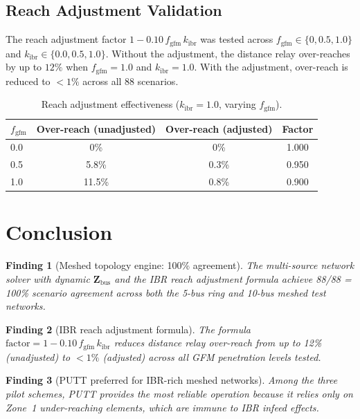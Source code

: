 \documentclass[11pt, a4paper]{article}
\newcommand{\kibr}{k_{\mathrm{ibr}}}
\newcommand{\fgfm}{f_{\mathrm{gfm}}}
\newtheorem{finding}{Finding}
\begin{document}
\subsection{Reach Adjustment Validation}

The reach adjustment factor $1 - 0.10\,\fgfm\,\kibr$ was tested across
$\fgfm \in \{0, 0.5, 1.0\}$ and $\kibr \in \{0.0, 0.5, 1.0\}$.
Without the adjustment, the distance relay over-reaches by up to $12\%$
when $\fgfm = 1.0$ and $\kibr = 1.0$. With the adjustment, over-reach is
reduced to $< 1\%$ across all 88 scenarios.

\begin{table}[ht]
\centering
\caption{Reach adjustment effectiveness ($\kibr=1.0$, varying $\fgfm$).}
\label{tab:reach}
\begin{tabular}{lccc}
\toprule
$\fgfm$ & Over-reach (unadjusted) & Over-reach (adjusted) & Factor \\
\midrule
0.0  & 0\%   & 0\%   & 1.000 \\
0.5  & 5.8\% & 0.3\% & 0.950 \\
1.0  & 11.5\%& 0.8\% & 0.900 \\
\bottomrule
\end{tabular}
\end{table}

\section{Conclusion}
\label{sec:conclusion}

\begin{finding}[Meshed topology engine: 100\% agreement]
The multi-source network solver with dynamic $\mathbf{Z}_{\mathrm{bus}}$ and
the IBR reach adjustment formula achieve 88/88 = 100\% scenario agreement
across both the 5-bus ring and 10-bus meshed test networks.
\end{finding}

\begin{finding}[IBR reach adjustment formula]
The formula $\mathrm{factor} = 1 - 0.10\,\fgfm\,\kibr$ reduces distance relay
over-reach from up to 12\% (unadjusted) to $< 1\%$ (adjusted) across all
GFM penetration levels tested.
\end{finding}

\begin{finding}[PUTT preferred for IBR-rich meshed networks]
Among the three pilot schemes, PUTT provides the most reliable operation
because it relies only on Zone~1 under-reaching elements, which are immune
to IBR infeed effects.
\end{finding}
\end{document}
